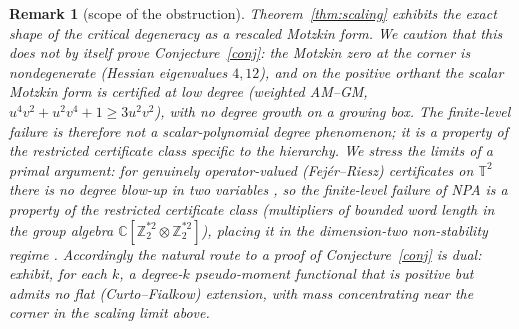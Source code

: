 \documentclass[11pt]{article}
\newtheorem{remark}[theorem]{Remark}
\begin{document}
\begin{remark}[scope of the obstruction]
Theorem~\ref{thm:scaling} exhibits the exact \emph{shape} of the critical
degeneracy as a rescaled Motzkin form. We caution that this does not by itself
prove Conjecture~\ref{conj}: the Motzkin zero at the corner is nondegenerate
(Hessian eigenvalues $4,12$), and on the positive orthant the scalar Motzkin
form is certified at low degree (weighted AM--GM,
$u^4v^2+u^2v^4+1\ge3u^2v^2$), with no degree growth on a growing box. The
finite-level failure is therefore not a scalar-polynomial degree phenomenon; it
is a property of the \emph{restricted} certificate class specific to the
hierarchy. We stress the limits of a
\emph{primal} argument: for genuinely operator-valued (Fej\'er--Riesz)
certificates on $\mathbb T^2$ there is no degree blow-up in two variables
\cite{Dritschel}, so the finite-level failure of NPA is a
property of the \emph{restricted} certificate class (multipliers of bounded
word length in the group algebra $\mathbb C[\mathbb Z_2^{*2}\otimes\mathbb
Z_2^{*2}]$), placing it in the dimension-two non-stability regime
\cite{Scheiderer}. Accordingly the natural route to a proof of
Conjecture~\ref{conj} is \emph{dual}: exhibit, for each $k$, a degree-$k$
pseudo-moment functional that is positive but admits no flat (Curto--Fialkow)
extension, with mass concentrating near the corner in the scaling limit above.
\end{remark}
\end{document}
